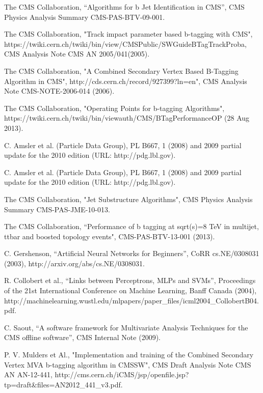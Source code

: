 \begin{thebibliography}{99}
 The CMS Collaboration, ``Algorithms for b Jet Identification in CMS'', CMS Physics Analysis Summary CMS-PAS-BTV-09-001.

The CMS Collaboration, "Track impact parameter based b-tagging with CMS", https://twiki.cern.ch/twiki/bin/view/CMSPublic/SWGuideBTagTrackProba, CMS Analysis Note CMS AN 2005/041(2005).

The CMS Collaboration, "A Combined Secondary Vertex Based B-Tagging Algorithm in CMS", http://cds.cern.ch/record/927399?ln=en", CMS Analysis Note CMS-NOTE-2006-014 (2006).

The CMS Collaboration, "Operating Points for b-tagging Algorithms", https://twiki.cern.ch/twiki/bin/viewauth/CMS/BTagPerformanceOP (28 Aug 2013).

 C. Amsler et al. (Particle Data Group), PL B667, 1 (2008) and 2009 partial update for the 2010 edition (URL: http://pdg.lbl.gov).
 
 C. Amsler et al. (Particle Data Group), PL B667, 1 (2008) and 2009 partial update for the 2010 edition (URL: http://pdg.lbl.gov).

  The CMS Collaboration, "Jet Substructure Algorithms", CMS Physics Analysis Summary CMS-PAS-JME-10-013.
 
  The CMS Collaboration, ``Performance of b tagging at sqrt(s)=8 TeV in multijet, ttbar and boosted topology events", CMS-PAS-BTV-13-001 (2013).
 
 C. Gershenson, ``Artificial Neural Networks for Beginners'', CoRR cs.NE/0308031 (2003), http://arxiv.org/abs/cs.NE/0308031.
 
 R. Collobert et al., ``Links between Perceptrons, MLPs and SVMs'', Proceedings of the 21st International Conference on Machine Learning, Banff Canada (2004), http://machinelearning.wustl.edu/mlpapers/paper\_files/icml2004\_CollobertB04.pdf.
 
 C. Saout, ``A software framework for Multivariate Analysis Techniques for the CMS offline software'', CMS Internal Note (2009).

 P. V. Mulders et Al., "Implementation and training of the Combined Secondary Vertex MVA b-tagging algorithm in CMSSW", CMS Draft Analysis Note CMS AN AN-12-441, http://cms.cern.ch/iCMS/jsp/openfile.jsp?tp=draft\&files=AN2012\_441\_v3.pdf.



\end{thebibliography}
